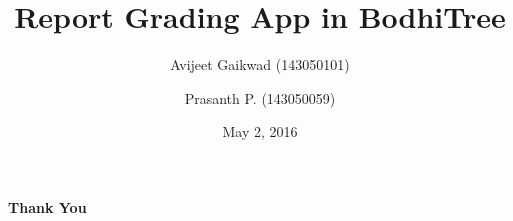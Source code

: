 \documentclass[13pt]{beamer}
\title{Report Grading App in BodhiTree}
\author{
  Avijeet Gaikwad (143050101)\\
  \and
  Prasanth P. (143050059)
}
\date{May 2, 2016}
\begin{document}
\maketitle





\begin{frame}
	\begin{center}
	      \textbf{Thank You}
	\end{center}

\end{frame}
\end{document}
